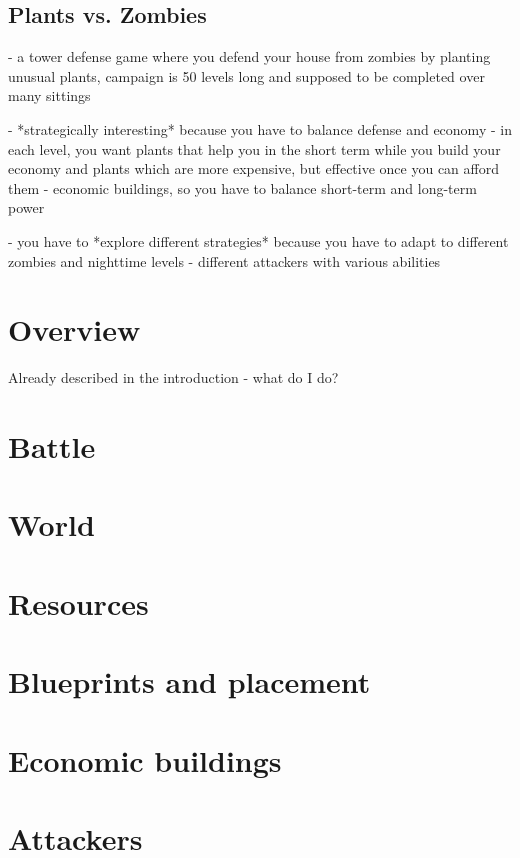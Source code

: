 \subsection{Plants vs. Zombies}

- a tower defense game where you defend your house from zombies by planting unusual plants, campaign is 50 levels long and supposed to be completed over many sittings

- *strategically interesting* because you have to balance defense and economy - in each level, you want plants that help you in the short term while you build your economy and plants which are more expensive, but effective once you can afford them - economic buildings, so you have to balance short-term and long-term power

- you have to *explore different strategies* because you have to adapt to different zombies and nighttime levels - different attackers with various abilities

\section{Overview}

Already described in the introduction - what do I do?

\section{Battle}

\section{World}

\section{Resources}

\section{Blueprints and placement}

\section{Economic buildings}

\section{Attackers}

